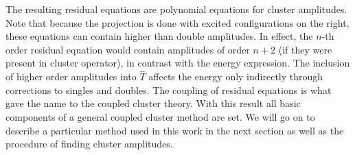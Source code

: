 %
The resulting residual equations are polynomial equations for cluster 
amplitudes. Note that because the projection is done with excited 
configurations on the right, these equations can contain higher than double 
amplitudes. In effect, the $n$-th order residual equation would contain 
amplitudes of order $n + 2$ (if they were present in cluster operator), in 
contrast with the energy expression. The inclusion of higher order amplitudes 
into $\hat{T}$ affects the energy only indirectly through corrections to 
singles and doubles. The coupling of residual equations is what gave the name 
to the coupled cluster theory. With this result all basic components of a 
general coupled cluster method are set. We will go on to describe a 
particular method used in this work in the next section as well as the procedure 
of finding cluster amplitudes.


